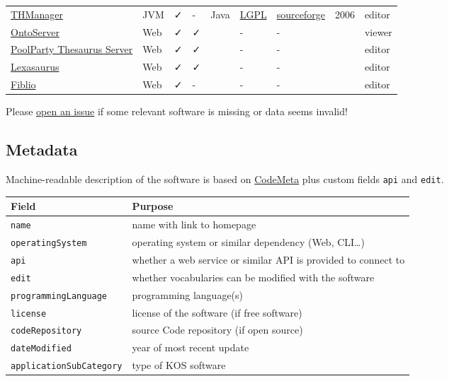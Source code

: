 \documentclass[
  DIV=10]{article}
\begin{document}
\begin{longtable}[]{@{}lllllllll@{}}
\href{https://thmanager.sourceforge.io/}{THManager} & JVM & ✓ & - & Java
& \href{https://spdx.org/licenses/LGPL-3.0-or-later}{LGPL} &
\href{https://sourceforge.net/projects/thmanager/}{sourceforge} & 2006 &
editor \\
\href{https://ontoserver.csiro.au/}{OntoServer} & Web & ✓ & ✓ & & - & -
& & viewer \\
\href{https://www.poolparty.biz/poolparty-thesaurus-manager}{PoolParty
Thesaurus Server} & Web & ✓ & ✓ & & - & - & & editor \\
\href{http://www.k-int.com/products/lexaurus/}{Lexasaurus} & Web & ✓ & ✓
& & - & - & & editor \\
\href{https://www.fiblio.de/}{Fiblio} & Web & ✓ & - & & - & - & &
editor \\

\end{longtable}

Please
\href{https://github.com/gbv/bartoc-vocabulary-software/issues}{open an
issue} if some relevant software is missing or data seems invalid!

\newpage
{}
\recalctypearea

\subsection{Metadata}\label{metadata}

Machine-readable description of the software is based on
\href{https://codemeta.github.io/}{CodeMeta} plus custom fields
\texttt{api} and \texttt{edit}.

\begin{longtable}[]{@{}
  >{\raggedright\arraybackslash}p{}
  >{\raggedright\arraybackslash}p{}@{}}
\toprule\noalign{}
\begin{minipage}[b]{\linewidth}\raggedright
Field
\end{minipage} & \begin{minipage}[b]{\linewidth}\raggedright
Purpose
\end{minipage} \\
\midrule\noalign{}
\endhead
\bottomrule\noalign{}
\endlastfoot
\texttt{name} & name with link to homepage \\
\texttt{operatingSystem} & operating system or similar dependency (Web,
CLI\ldots) \\
\texttt{api} & whether a web service or similar API is provided to
connect to \\
\texttt{edit} & whether vocabularies can be modified with the
software \\
\texttt{programmingLanguage} & programming language(s) \\
\texttt{license} & license of the software (if free software) \\
\texttt{codeRepository} & source Code repository (if open source) \\
\texttt{dateModified} & year of most recent update \\
\texttt{applicationSubCategory} & type of KOS software \\
\end{longtable}
\end{document}

